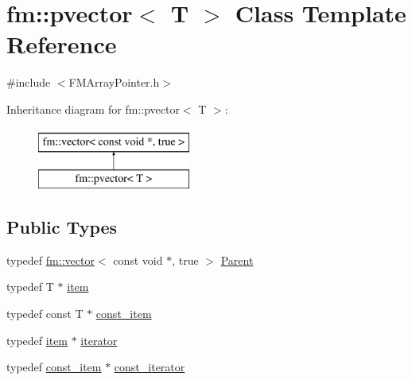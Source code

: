 \hypertarget{classfm_1_1pvector}{
\section{fm::pvector$<$ T $>$ Class Template Reference}
\label{classfm_1_1pvector}
}


{\ttfamily \#include $<$FMArrayPointer.h$>$}

Inheritance diagram for fm::pvector$<$ T $>$:\begin{figure}[H]
\begin{center}
\leavevmode
\includegraphics[height=2.000000cm]{classfm_1_1pvector}
\end{center}
\end{figure}
\subsection*{Public Types}
\begin{DoxyCompactItemize}
\item 
typedef \hyperlink{classfm_1_1vector}{fm::vector}$<$ const void $\ast$, true $>$ \hyperlink{classfm_1_1pvector_a54d275330978b8967deb9c96c06824ef}{Parent}
\item 
typedef T $\ast$ \hyperlink{classfm_1_1pvector_af6ced3802a18342adc0b26355d1b75bf}{item}
\item 
typedef const T $\ast$ \hyperlink{classfm_1_1pvector_a6b343b4ab437d545714ff971a512bd68}{const\_\-item}
\item 
typedef \hyperlink{classfm_1_1pvector_af6ced3802a18342adc0b26355d1b75bf}{item} $\ast$ \hyperlink{classfm_1_1pvector_aee306ff70b8a124899a67cbe5b2fabb3}{iterator}
\item 
typedef \hyperlink{classfm_1_1pvector_a6b343b4ab437d545714ff971a512bd68}{const\_\-item} $\ast$ \hyperlink{classfm_1_1pvector_a3b3854f2e635665ad6a0d59bf841099a}{const\_\-iterator}
\end{DoxyCompactItemize}
